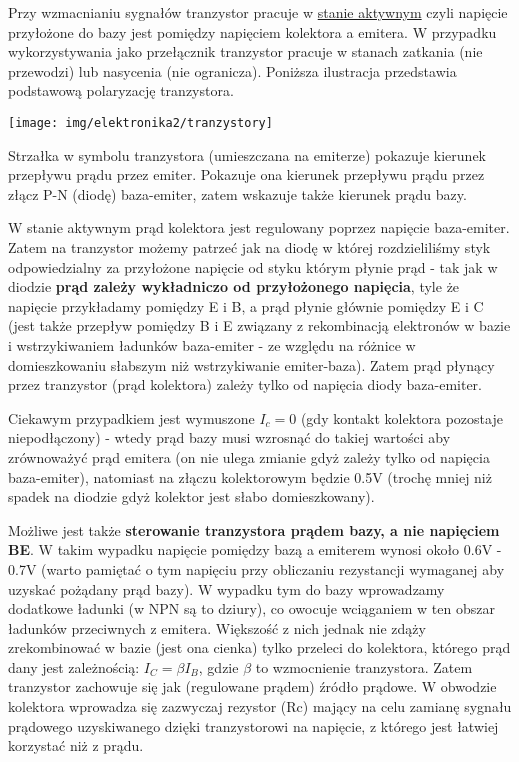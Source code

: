 \documentclass{pdfBooklets}
\begin{document}
Przy wzmacnianiu sygnałów tranzystor pracuje w \href{https://pl.wikipedia.org/wiki/Tranzystor bipolarny#Stany_pracy}{stanie aktywnym} czyli napięcie przyłożone do bazy jest pomiędzy napięciem kolektora a emitera. W przypadku wykorzystywania jako przełącznik tranzystor pracuje w stanach zatkania (nie przewodzi) lub nasycenia (nie ogranicza). Poniższa ilustracja przedstawia podstawową polaryzację tranzystora.

\begin{center}\texttt{[image: img/elektronika2/tranzystory]}\end{center}

Strzałka w symbolu tranzystora (umieszczana na emiterze) pokazuje kierunek przepływu prądu przez emiter.
Pokazuje ona kierunek przepływu prądu przez złącz P-N (diodę) baza-emiter, zatem wskazuje także kierunek prądu bazy.

W stanie aktywnym prąd kolektora jest regulowany poprzez napięcie baza-emiter.
Zatem na tranzystor możemy patrzeć jak na diodę w której rozdzieliliśmy styk odpowiedzialny za przyłożone napięcie od styku którym płynie prąd - tak jak w diodzie {\bf prąd zależy wykładniczo od przyłożonego napięcia}, tyle że napięcie przykładamy pomiędzy E i B, a prąd płynie głównie pomiędzy E i C (jest także przepływ pomiędzy B i E związany z rekombinacją elektronów w bazie i wstrzykiwaniem ładunków baza-emiter - ze względu na różnice w domieszkowaniu słabszym niż wstrzykiwanie emiter-baza).
Zatem prąd płynący przez tranzystor (prąd kolektora) zależy tylko od napięcia diody baza-emiter.

Ciekawym przypadkiem jest wymuszone $I_c = 0$ (gdy kontakt kolektora pozostaje niepodłączony) - wtedy prąd bazy musi wzrosnąć do takiej wartości aby zrównoważyć prąd emitera (on nie ulega zmianie gdyż zależy tylko od napięcia baza-emiter), natomiast na złączu kolektorowym będzie 0.5V (trochę mniej niż spadek na diodzie gdyż kolektor jest słabo domieszkowany).

Możliwe jest także {\bf sterowanie tranzystora prądem bazy, a nie napięciem BE}.
W takim wypadku napięcie pomiędzy bazą a emiterem wynosi około 0.6V - 0.7V (warto pamiętać o tym napięciu przy obliczaniu rezystancji wymaganej aby uzyskać pożądany prąd bazy).
W wypadku tym do bazy wprowadzamy dodatkowe ładunki (w NPN są to dziury), co owocuje wciąganiem w ten obszar ładunków przeciwnych z emitera.
Większość z nich jednak nie zdąży zrekombinować w bazie (jest ona cienka) tylko przeleci do kolektora, którego prąd dany jest zależnością: $I_C = \beta I_B$, gdzie $\beta$ to wzmocnienie tranzystora.
Zatem tranzystor zachowuje się jak (regulowane prądem) źródło prądowe.
W obwodzie kolektora wprowadza się zazwyczaj rezystor (Rc) mający na celu zamianę sygnału prądowego uzyskiwanego dzięki tranzystorowi na napięcie, z którego jest łatwiej korzystać niż z prądu.
\end{document}
